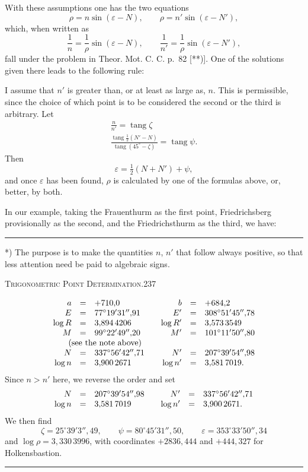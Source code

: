 With these assumptions one has the two equations
\[
\rho=n\sin(\varepsilon-N),\qquad\rho=n'\sin(\varepsilon-N'),
\]
which, when written as
\[
\frac1n=\frac1\rho\sin(\varepsilon-N),\qquad\frac1{n'}=\frac1\rho\sin(\varepsilon-N'),
\]
fall under the problem in Theor. Mot. C. C. p.~82 [**)]. One of the solutions given there leads to the following rule:

I assume that $n'$ is greater than, or at least as large as, $n$. This is permissible, since the choice of which point is to be considered the second or the third is arbitrary. Let
\[
\begin{gathered}
\frac n{n'}=\operatorname{tang}\zeta\\[5pt]
\frac{\operatorname{tang}\frac12(N'-N)}{\operatorname{tang}(45^\circ-\zeta)}=\operatorname{tang}\psi.
\end{gathered}
\]
Then
\[
\varepsilon=\tfrac12(N+N')+\psi,
\]
and once $\varepsilon$ has been found, $\rho$ is calculated by one of the formulas above, or, better, by both.

In our example, taking the Frauenthurm as the first point, Friedrichsberg provisionally as the second, and the Friedrichsthurm as the third, we have:
\vfill
\noindent\rule{4cm}{.4pt}\par
{\footnotesize
*) The purpose is to make the quantities $n$, $n'$ that follow always positive, so that less attention need be paid to algebraic signs.\par
[**) Volume VII, page 100.]\par}

\clearpage
\noindent\mbox{}\hfill\textsc{Trigonometric Point Determination.}\hfill237\par\medskip
\[
\begin{array}{rcl@{\qquad}rcl}
a&=&+710{,}0&b&=&+684{,}2\\
E&=&77^\circ19'31''{,}91&E'&=&308^\circ51'45''{,}78\\
\log R&=&3{,}894\,4206&\log R'&=&3{,}573\,3549\\
M&=&99^\circ22'49''{,}20&M'&=&101^\circ11'50''{,}80\\
\multicolumn{3}{c}{\text{(see the note above)}}&&&\\
N&=&337^\circ56'42''{,}71&N'&=&207^\circ39'54''{,}98\\
\log n&=&3{,}900\,2671&\log n'&=&3{,}581\,7019.
\end{array}
\]
Since $n>n'$ here, we reverse the order and set
\[
\begin{array}{rcl@{\qquad}rcl}
N&=&207^\circ39'54''{,}98&N'&=&337^\circ56'42''{,}71\\
\log n&=&3{,}581\,7019&\log n'&=&3{,}900\,2671.
\end{array}
\]
We then find
\[
\zeta=25^\circ39'3''{,}49,\qquad
\psi=80^\circ45'31''{,}50,\qquad
\varepsilon=353^\circ33'50''{,}34
\]
and $\log\rho=3{,}330\,3996$, with coordinates $+2836{,}444$ and $+444{,}327$ for Holkensbastion.
\vspace{1cm}
\begin{center}\rule{4cm}{.4pt}\end{center}

